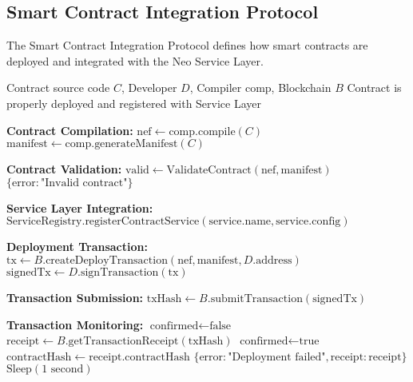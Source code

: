 \subsection{Smart Contract Integration Protocol}
\label{subsec:smart-contract-protocol}

The Smart Contract Integration Protocol defines how smart contracts are deployed and integrated with the Neo Service Layer.

\begin{protocol}
\label{prot:smart-contract-deployment}
\begin{algorithmic}[1]
\Require Contract source code $C$, Developer $D$, Compiler $\text{comp}$, Blockchain $B$
\Ensure Contract is properly deployed and registered with Service Layer

\State \textbf{Contract Compilation:}
\State $\text{nef} \gets \text{comp}.\text{compile}(C)$
\State $\text{manifest} \gets \text{comp}.\text{generateManifest}(C)$

\State \textbf{Contract Validation:}
\State $\text{valid} \gets \text{ValidateContract}(\text{nef}, \text{manifest})$
    \State \Return $\{\text{error}: \text{"Invalid contract"}\}$
\EndIf

\State \textbf{Service Layer Integration:}
    \State $\text{ServiceRegistry}.\text{registerContractService}(\text{service}.\text{name}, \text{service}.\text{config})$
\EndFor

\State \textbf{Deployment Transaction:}
\State $\text{tx} \gets B.\text{createDeployTransaction}(\text{nef}, \text{manifest}, D.\text{address})$
\State $\text{signedTx} \gets D.\text{signTransaction}(\text{tx})$

\State \textbf{Transaction Submission:}
\State $\text{txHash} \gets B.\text{submitTransaction}(\text{signedTx})$

\State \textbf{Transaction Monitoring:}
\State $\text{confirmed} \gets \text{false}$
    \State $\text{receipt} \gets B.\text{getTransactionReceipt}(\text{txHash})$
        \State $\text{confirmed} \gets \text{true}$
            \State $\text{contractHash} \gets \text{receipt}.\text{contractHash}$
        \Else
            \State \Return $\{\text{error}: \text{"Deployment failed"}, \text{receipt}: \text{receipt}\}$
        \EndIf
    \EndIf
        \State $\text{Sleep}(1\text{ second})$
    \EndIf
\EndWhile


\end{algorithmic}
\end{protocol}
